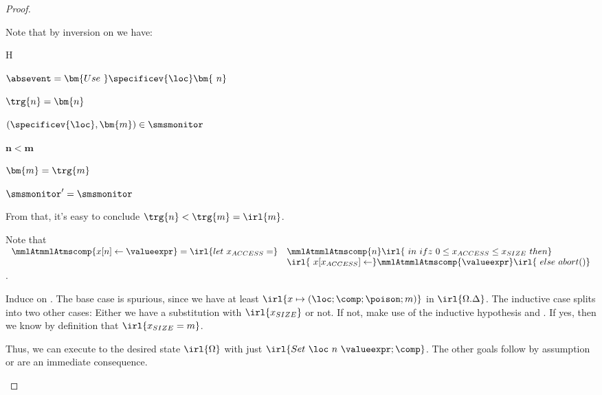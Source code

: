\documentclass[a4paper,names,dvipsnames]{article}
\begin{document}
\begin{proof}
\begin{description}
          Note that by inversion on  we have:
          \begin{passumptions}{H}
            \item $\absevent=\bm{Use\ }\specificev{\loc}\bm{\ n}$
            \item $\trg{n}=\bm{n}$
            \item $(\specificev{\loc},\bm{m})\in\smsmonitor$
            \item $\bm{n}<\bm{m}$
            \item $\bm{m}=\trg{m}$
            \item $\smsmonitor'=\smsmonitor$
          \end{passumptions}
          From that, it's easy to conclude $\trg{n}<\trg{m}=\irl{m}$.

          Note that $\begin{array}{ll}\mmlAtmmlAtmscomp{x[n]\leftarrow\valueexpr}=\irl{let\ x_{ACCESS}=}&\mmlAtmmlAtmscomp{n}\irl{\ in\ ifz\ 0\le x_{ACCESS}\le x_{SIZE}\ then}\\&\irl{\ x[x_{ACCESS}]\leftarrow}\mmlAtmmlAtmscomp{\valueexpr}\irl{\ else\ abort()}\end{array}$.

          Induce on . The base case is spurious, since we have at least $\irl{x\mapsto(\loc;\comp;\poison;m)}$ in $\irl{\Omega.\Delta}$.
          The inductive case splits into two other cases: Either we have a substitution with $\irl{x_{SIZE}}$ or not. If not, make use of the inductive hypothesis and . If yes, then we know by definition that $\irl{x_{SIZE}=m}$.

          Thus, we can execute to the desired state $\irl{\Omega}$ with just $\irl{Set\ \loc\ n\ \valueexpr;\comp}$.
          The other goals follow by assumption or are an immediate consequence.


\end{description}
\end{proof}
\end{document}
